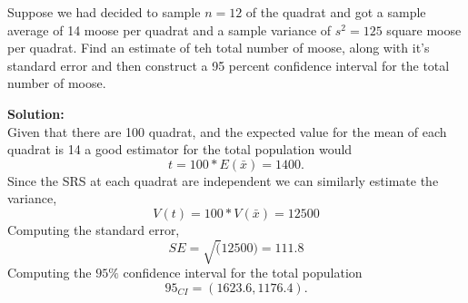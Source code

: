 \documentclass[12pt]{article}
\makeatletter
\theoremstyle{homework}
\newenvironment{exercise}[1]
{\def\@currentlabel{#1}\exercisecore}
{\endexercisecore}
\newcommand{\localhead}[1]{\par\smallskip\noindent\textbf{#1}\nobreak\\}%
\newcommand\solution{\localhead{Solution:}}
\makeatother
\begin{document}
\begin{exercise}{4} Suppose we had decided to sample $n = 12$ of the quadrat and got a sample average of 
    14 moose per quadrat and a sample variance of $s^2 = 125$ square moose per quadrat. Find an estimate of teh total
    number of moose, along with it's standard error and then construct a 95 percent confidence interval for the total number of moose. \\
    \solution Given that there are 100 quadrat, and the expected value for the mean of each quadrat is 14 a good estimator for the total population would
        \begin{equation*}
            t = 100*E(\bar{x}) = 1400.
        \end{equation*}
    Since the SRS at each quadrat are independent we can similarly estimate the variance, 
        \begin{equation*}
            V(t) = 100*V(\bar{x}) = 12500
        \end{equation*}
    Computing the standard error, 
    \begin{equation*}
        SE = \sqrt(12500) = 111.8
    \end{equation*}
    Computing the $95\%$ confidence interval for the total population
    \begin{equation*}
        95_{CI} = (1623.6, 1176.4).
    \end{equation*}
\end{exercise}
\vspace{1in}
\end{document}

